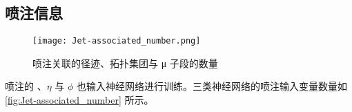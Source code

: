 \subsection{喷注信息}
\begin{figure}[ht]
      \centering
      \texttt{[image: Jet-associated\_number.png]}
      \caption{喷注关联的径迹、拓扑集团与 μ 子段的数量}
      \label{fig:Jet-associated_number}
\end{figure}

喷注的 \pt、$\eta$ 与 $\phi$ 也输入神经网络进行训练。三类神经网络的喷注输入变量数量如\autoref{fig:Jet-associated_number} 所示。
